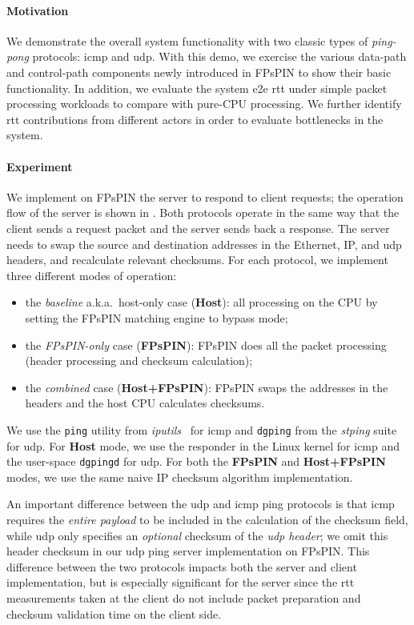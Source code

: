 \paragraph{Motivation} We demonstrate the overall system functionality with two classic types of \emph{ping-pong} protocols: \ac{icmp} and \ac{udp}.  With this demo, we exercise the various data-path and control-path components newly introduced in FPsPIN to show their basic functionality.  In addition, we evaluate the system \ac{e2e} \ac{rtt} under simple packet processing workloads to compare with pure-CPU processing.  We further identify \ac{rtt} contributions from different actors in order to evaluate bottlenecks in the system.

\paragraph{Experiment} We implement on FPsPIN the server to respond to client requests; the operation flow of the server is shown in .  Both protocols operate in the same way that the client sends a request packet and the server sends back a response.  The server needs to swap the source and destination addresses in the Ethernet, IP, and \ac{udp} headers, and recalculate relevant checksums.  For each protocol, we implement three different modes of operation:
\begin{itemize}
    \item the \emph{baseline} a.k.a.\ host-only case (\textbf{Host}): all processing on the CPU by setting the FPsPIN matching engine to bypass mode;
    \item the \emph{FPsPIN-only} case (\textbf{FPsPIN}): FPsPIN does all the packet processing (header processing and checksum calculation);
    \item the \emph{combined} case (\textbf{Host+FPsPIN}): FPsPIN swaps the addresses in the headers and the host CPU calculates checksums.
\end{itemize}
We use the \texttt{ping} utility from \emph{iputils}~\cite{noauthor_iputilsiputils_2023} for \ac{icmp} and \texttt{dgping} from the \emph{stping} suite~\cite{katherine_stpingdgping_2023} for \ac{udp}.  For \textbf{Host} mode, we use the responder in the Linux kernel for \ac{icmp} and the user-space \texttt{dgpingd} for \ac{udp}.  For both the \textbf{FPsPIN} and \textbf{Host+FPsPIN} modes, we use the same naive IP checksum algorithm implementation.

An important difference between the \ac{udp} and \ac{icmp} ping protocols is that \ac{icmp} requires the \emph{entire payload} to be included in the calculation of the checksum field, while \ac{udp} only specifies an \emph{optional} checksum of the \emph{\ac{udp} header}; we omit this header checksum in our \ac{udp} ping server implementation on FPsPIN.  This difference between the two protocols impacts both the server and client implementation, but is especially significant for the server since the \ac{rtt} measurements taken at the client do not include packet preparation and checksum validation time on the client side.

